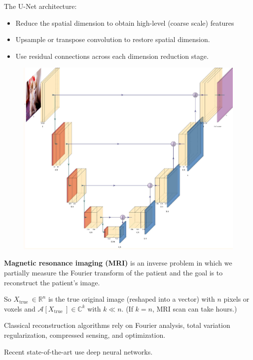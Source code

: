 \begin{definition}[8.25][U-Net]
    The U-Net architecture:

    \begin{itemize}
        \item Reduce the spatial dimension to obtain high-level (coarse scale) features
        \item Upsample or transpose convolution to restore spatial dimension.
        \item Use residual connections across each dimension reduction stage.
    \end{itemize}

    \begin{figure}[H]
        \centering
        \includegraphics[width=1.0\textwidth]{.././assets/8.25.jpg}
    \end{figure}
\end{definition}

\begin{definition}
    \textbf{Magnetic resonance imaging (MRI)} is an inverse problem in which we partially measure the Fourier transform of the patient and the goal is to reconstruct the patient's image.

    So $X_{\text {true }} \in \mathbb{R}^{n}$ is the true original image (reshaped into a vector) with $n$ pixels or voxels and $\mathcal{A}\left[X_{\text {true }}\right] \in \mathbb{C}^{k}$ with $k \ll n$. (If $k=n$, MRI scan can take hours.)

    Classical reconstruction algorithms rely on Fourier analysis, total variation regularization, compressed sensing, and optimization.

    Recent state-of-the-art use deep neural networks.
\end{definition}

